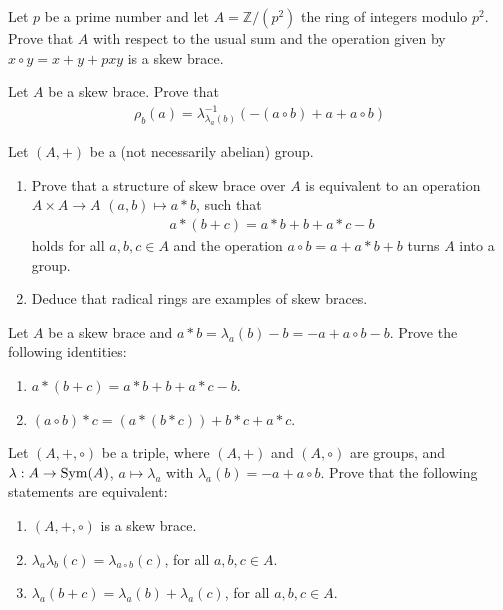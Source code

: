 \begin{exercise}
    Let $p$ be a prime number and let  $A=\mathbb{Z}/(p^2)$ the ring of integers modulo $p^2$. Prove that $A$ with respect to the usual sum and the operation given by $x \circ y = x+y+pxy$ is a skew brace.
\end{exercise}

\begin{exercise}
    Let $A$ be a skew brace. Prove that
    \begin{align*}
        \rho_b(a) = \lambda^{-1}_{\lambda_a(b)}(-(a\circ b) +a+a\circ b)
    \end{align*}
\end{exercise}

\begin{exercise}
    Let $(A,+)$ be a (not necessarily abelian) group. 
    \begin{enumerate}
        \item Prove that a structure of skew brace over $A$ is equivalent to an operation $A\times A \to A$ $(a,b)\mapsto a\ast b$, such that
        \begin{align*}
            a \ast (b+c) = a\ast b + b + a\ast c - b
        \end{align*}
        holds for all $a,b,c \in A$ and the operation $a\circ b = a+ a\ast b + b$ turns $A$ into a group.
        \item Deduce that radical rings are examples of skew braces. 
        \end{enumerate}
\end{exercise}

\begin{exercise}
    Let $A$ be a skew brace and $a\ast b = \lambda_a(b)-b = -a+a\circ b - b$. Prove the following identities:
    \begin{enumerate}
        \item $a\ast (b+c) = a\ast b + b +a\ast c -b$.
        \item $(a\circ b)\ast c = (a\ast(b\ast c)) + b\ast c + a\ast c$.
    \end{enumerate}
\end{exercise}

\begin{exercise}
    Let $(A,+,\circ)$ be a triple, where $(A,+)$ and $(A,\circ)$ are groups, and $\lambda: A \to \operatorname{Sym}(A)$, $a\mapsto \lambda_a$ with $\lambda_a(b)=-a+a\circ b$. Prove that the following statements are equivalent:
    \begin{enumerate}
        \item $(A,+,\circ)$ is a skew brace.
        \item $\lambda_a\lambda_b(c)=\lambda_{a\circ b}(c)$, for all $a,b,c\in A$.
        \item $\lambda_a(b+c) = \lambda_a(b)+\lambda_a(c)$, for all $a,b,c\in A$.
    \end{enumerate}
\end{exercise}

